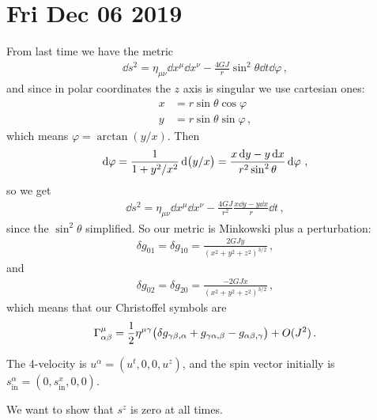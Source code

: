 \documentclass[main.tex]{subfiles}
\begin{document}
\section*{Fri Dec 06 2019}

From last time we have the metric 
%
\begin{align}
  \dd{s^2} = \eta_{\mu \nu } \dd{x^{\mu }} \dd{x^{\nu }}  - \frac{4GJ}{r} \sin^2 \theta \dd{t} \dd{\varphi }
\,,
\end{align}
%
and since in polar coordinates the \(z\) axis is singular we use cartesian ones: 
%
\begin{align}
  x &= r \sin \theta \cos \varphi  \\
  y &= r \sin \theta \sin \varphi 
\,,
\end{align}
%
which means \(\varphi = \arctan (y/x)\). Then 
%
\begin{align}
  \dd{\varphi } = \frac{1}{1 + y^2 / x^2} \dd{\qty(y/x)}
  = \frac{x \dd{y} - y \dd{x}}{r^2 \sin^2\theta } \dd{\varphi }
\,,
\end{align}
%
so we get 
%
\begin{align}
  \dd{s^2} = \eta_{\mu \nu } \dd{x^{\mu }} \dd{x^{\nu }}  
  - \frac{4GJ}{r^2} \frac{x \dd{y} - y \dd{x}}{r} \dd{t} 
\,,
\end{align}
%
since the \(\sin^2 \theta\) simplified. 
So our metric is Minkowski plus a perturbation: 
%
\begin{align}
  \delta g_{01} = \delta g_{10} = \frac{2GJy}{(x^2+ y^2+z^2)^{3/2}}
\,,
\end{align}
%
and 
%
\begin{align}
    \delta g_{02} = \delta g_{20} = \frac{-2GJx}{(x^2+ y^2+z^2)^{3/2}}
  \,,
\end{align}
%
which means that our Christoffel symbols are 
%
\begin{align}
  \Gamma^{\mu }_{\alpha \beta } = \frac{1}{2} \eta^{\mu \gamma } \qty(\delta g_{\gamma \beta, \alpha } + g_{\gamma \alpha , \beta } - g_{\alpha \beta , \gamma })
  + O(J^2)
\,.
\end{align}

The 4-velocity is \(u^{ \alpha } = (u^{t}, 0, 0, u^{z})\), and the spin vector initially is \(s^{\alpha } _{\text{in}} = (0, s^{x} _{\text{in}}, 0,0)\).

We want to show that \(s^{z}\) is zero at all times. 
\end{document}
